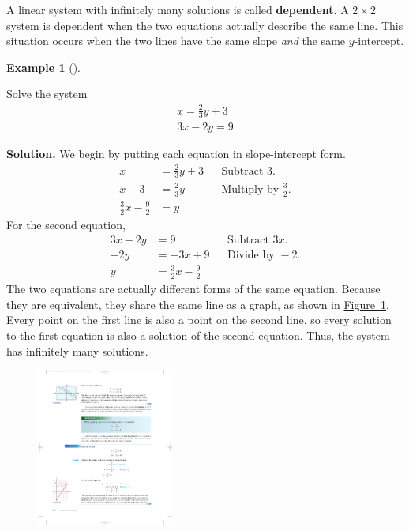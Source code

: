 \documentclass[10pt,]{book}
\newcommand{\terminology}[1]{\textbf{#1}}
\theoremstyle{plain}
\theoremstyle{definition}
\theoremstyle{definition}
\newtheorem{example}[theorem]{Example}
\theoremstyle{definition}
\theoremstyle{definition}
\numberwithin{equation}{section}
\newcommand{\amp}{ & }
\begin{document}
	A linear system with infinitely many solutions is called \terminology{dependent}. A \(2\times 2\) system is dependent when the two equations actually describe the same line. This situation occurs when the two lines have the same slope \emph{and} the same \(y\)-intercept.
%
\begin{example}[]\label{example-5}

		Solve the system
		\begin{gather*}

				x = \frac{2}{3}y + 3
			\\

				3x − 2y = 9
			
\end{gather*}
\par\medskip\noindent%
\textbf{Solution.}\quad 
		We begin by putting each equation in slope-intercept form.
		\begin{align*}

				x \amp = \frac{2}{3}y + 3\amp\amp\text{Subtract 3.}				
			\\

				x -3\amp = \frac{2}{3}y \amp\amp\text{Multiply by }	\frac{3}{2}.							
			\\

				\frac{3}{2}x-\frac{9}{2}\amp = y
			
\end{align*}
		For the second equation,
		\begin{align*}

				3x − 2y \amp = 9  \amp\amp\text{Subtract }	3x.
			\\

				−2y \amp = −3x + 9  \amp\amp\text{Divide by } -2.
			\\

				y \amp = \frac{3}{2}x − \frac{9}{2}
			
\end{align*}
		The two equations are actually different forms of the same equation. Because they are equivalent, they share the same line as a graph, as shown in \hyperref[fig-coincident-lines]{Figure~\ref{fig-coincident-lines}}. Every point on the first line is also a point on the second line, so every solution to the first equation is also a solution of the second equation. Thus, the system has infinitely many solutions.
		\leavevmode%
\begin{figure}
\centering
\includegraphics[width=0.40\textwidth,]{images/fig-coincident-lines.pdf}\caption{\label{fig-coincident-lines}}
\end{figure}

\end{example}
\end{document}
